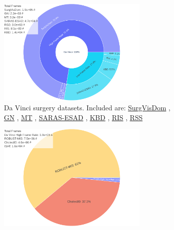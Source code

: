 \begin{figure}
\centering
\begin{subfigure}[b]{\textwidth}
    \centering
    \includegraphics[width=0.8\textwidth]{fig/fig_da_vinci.pdf}
    \caption{Da Vinci surgery datasets. Included are: \href{https://surgvisdom.grand-challenge.org/}{SurgVisDom} \cite{zia2021surgical}, \href{http://hamlyn.doc.ic.ac.uk/vision/}{GN} \cite{giannarou2012probabilistic}, \href{http://hamlyn.doc.ic.ac.uk/vision/}{MT} \cite{mountney2010three}, \href{https://saras-esad.grand-challenge.org/}{SARAS-ESAD} \cite{bawa2020esad}, \href{https://endovissub2017-kidneyboundarydetection.grand-challenge.org/}{KBD} \cite{hattab2020kidney}, \href{https://endovissub2017-roboticinstrumentsegmentation.grand-challenge.org/}{RIS} \cite{allan20192017}, \href{https://endovissub2018-roboticscenesegmentation.grand-challenge.org/home/}{RSS} \cite{allan20202018}}
    \label{c2:fig:data_a}
\end{subfigure}
\begin{subfigure}[b]{\textwidth}
    \centering
    \includegraphics[width=0.8\textwidth]{fig/fig_da_vinci_high_fps_laparoscopic.pdf}

\end{subfigure}
\end{figure}
